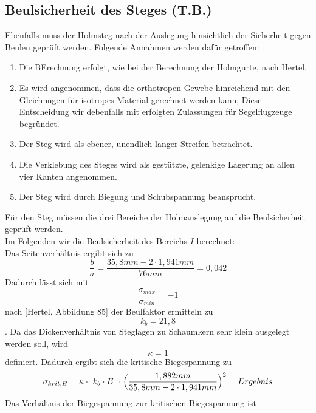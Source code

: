 \subsection{Beulsicherheit des Steges (T.B.)}
Ebenfalls muss der Holmsteg nach der Auslegung hinsichtlich der Sicherheit gegen Beulen geprüft werden. Folgende Annahmen werden dafür getroffen:\\
\begin{enumerate}
	\item Die BErechnung erfolgt, wie bei der Berechnung der Holmgurte, nach Hertel.
	\item Es wird angenommen, dass die orthotropen Gewebe hinreichend mit den Gleichnugen für isotropes Material gerechnet werden kann, Diese Entscheidung wir debenfalls mit erfolgten Zulassungen für Segelflugzeuge begründet.
	\item Der Steg wird als ebener, unendlich langer Streifen betrachtet.
	\item Die Verklebung des Steges wird als gestützte, gelenkige Lagerung an allen vier Kanten angenommen.
	\item Der Steg wird durch Biegung und Schubspannung beansprucht.
\end{enumerate}
Für den Steg müssen die drei Bereiche der Holmauslegung auf die Beulsicherheit geprüft werden. \\
\noindent Im Folgenden wir die Beulsicherheit des Bereichs $I$ berechnet:\\
\noindent Das Seitenverhältnis ergibt sich zu 
\begin{equation}
	\frac{b}{a}=\frac{35,8 mm-2\cdot 1,941 mm}{76 mm}=0,042
\end{equation}
Dadurch lässt sich mit 
\begin{equation}
	\frac{\sigma_{max}}{\sigma_{min}}=-1
\end{equation}
nach [Hertel, Abbildung 85] der Beulfaktor ermitteln zu
\begin{equation}
	k_{b} = 21,8
\end{equation}.
Da das Dickenverhältnis von Steglagen zu Schaumkern sehr klein ausgelegt werden soll, wird
\begin{equation}
	\kappa = 1
\end{equation}
definiert. Dadurch ergibt sich die kritische Biegespannung zu
\begin{equation}
	\sigma_{krit,B}=\kappa\cdot\ k_{b}\cdot E_{\parallel}\cdot\Bigl(\frac{1,882 mm}{35,8 mm-2\cdot 1,941 mm}\Bigr)^{2}=Ergebnis
\end{equation}
Das Verhältnis der Biegespannung zur kritischen Biegespannung ist
